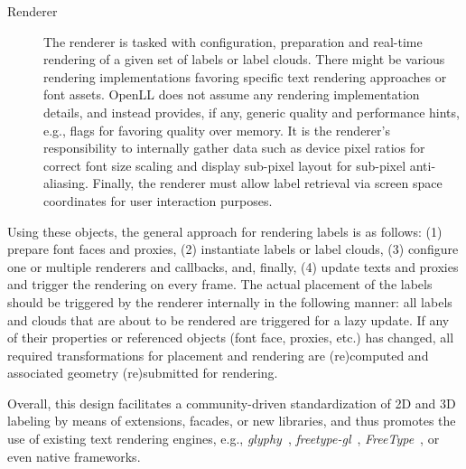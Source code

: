 \begin{description}
	\item [Renderer]
	The renderer is tasked with configuration, preparation and real-time rendering of a given set of labels or label clouds.
	There might be various rendering implementations favoring specific text rendering approaches or font assets.
	OpenLL does not assume any rendering implementation details, and instead provides, if any, generic quality and performance hints, e.g., flags for favoring quality over memory.
	It is the renderer's responsibility to internally gather data such as device pixel ratios for correct font size scaling and display sub-pixel layout for sub-pixel anti-aliasing.
	Finally, the renderer must allow label retrieval via screen space coordinates for user interaction purposes.

\end{description}

\smallskip
\noindent
Using these objects, the general approach for rendering labels is as follows: (1) prepare font faces and proxies, (2) instantiate labels or label clouds, (3) configure one or multiple renderers and callbacks, and, finally, (4) update texts and proxies and trigger the rendering on every frame.
The actual placement of the labels should be triggered by the renderer internally in the following manner:
all labels and clouds that are about to be rendered are triggered for a lazy update. If any of their properties or referenced objects (font face, proxies, etc.) has changed, all required transformations for placement and rendering are (re)computed and associated geometry (re)submitted for rendering.

Overall, this design facilitates a community-driven standardization of 2D and 3D labeling by means of extensions, facades, or new libraries, and thus promotes the use of existing text rendering engines, e.g., \emph{glyphy}~\cite{Esfahbod2011}, \emph{freetype-gl}~\cite{freetypegl2011}, \emph{FreeType}~\cite{freetype1996}, or even native frameworks.  
